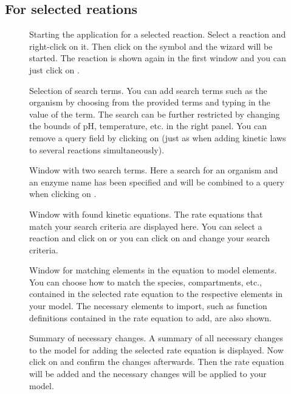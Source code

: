 \subsection{For selected reations}
\begin{figure}[htbp]
\caption{Starting the \SABIO application for a selected reaction.
Select a reaction and right-click on it.
Then click on the \SABIO symbol and the wizard will be started.
The reaction is shown again in the first window and you can just click on .}
\label{fig:startManual}
\end{figure}
\begin{figure}[htbp]
\caption{Selection of search terms.
You can add search terms such as the organism by choosing from the provided terms and
typing in the value of the term. The search can be further restricted by changing the
bounds of pH, temperature, etc. in the right panel. 
You can remove a query field by clicking on 
(just as when adding kinetic laws to several reactions simultaneously).}
\label{fig:searchTermsManual}
\end{figure}
\begin{figure}[htbp]
\caption{Window with two search terms.
Here a search for an organism and an enzyme name has been specified and will be
combined to a query when clicking on .}
\label{fig:searchTermsQuery}
\end{figure}
\begin{figure}[htbp]
\caption{Window with found kinetic equations.
The rate equations that match your search criteria are displayed here.
You can select a reaction and click on  or you can click on 
and change your search criteria.}
\label{fig:foundEquationsManual}
\end{figure}
\begin{figure}[htbp]
\caption{Window for matching elements in the equation to model elements.
You can choose how to match the species, compartments, etc., contained in the selected rate 
equation to the respective \SBML elements in your model. The necessary elements to import,
such as function definitions contained in the rate equation to add, are also shown.}
\label{fig:matching}
\end{figure}
\begin{figure}[htbp]
\caption{Summary of necessary changes.
A summary of all necessary changes to the model for adding the selected rate equation is displayed.
Now click on  and confirm the changes afterwards. Then the rate equation will be
added and the necessary changes will be applied to your model.}
\label{fig:changesManual}
\end{figure}

